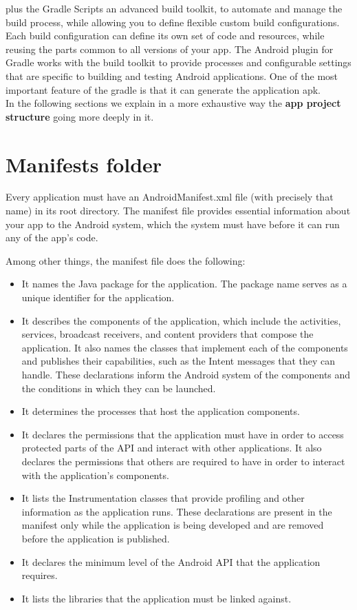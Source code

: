 plus the Gradle Scripts an advanced build toolkit, to automate and manage the build process, while allowing you to define flexible custom build configurations. Each build configuration can define its own set of code and resources, while reusing the parts common to all versions of your app. The Android plugin for Gradle works with the build toolkit to provide processes and configurable settings that are specific to building and testing Android applications. One of the most important feature of the gradle is that it can generate the application apk.\\

In the following sections we explain in a more exhaustive way the \textbf{app project structure} going more deeply in it.

\section{Manifests folder}
Every application must have an AndroidManifest.xml file (with precisely that name) in its root directory. The manifest file provides essential information about your app to the Android system, which the system must have before it can run any of the app's code.

Among other things, the manifest file does the following:

\begin{itemize}
\item It names the Java package for the application. The package name serves as a unique identifier for the application.

\item It describes the components of the application, which include the activities, services, broadcast receivers, and content providers that compose the application. It also names the classes that implement each of the components and publishes their capabilities, such as the Intent messages that they can handle. These declarations inform the Android system of the components and the conditions in which they can be launched.

\item It determines the processes that host the application components.

\item It declares the permissions that the application must have in order to access protected parts of the API and interact with other applications. It also declares the permissions that others are required to have in order to interact with the application's components.

\item It lists the Instrumentation classes that provide profiling and other information as the application runs. These declarations are present in the manifest only while the application is being developed and are removed before the application is published.

\item It declares the minimum level of the Android API that the application requires.

\item It lists the libraries that the application must be linked against.
\end{itemize}

